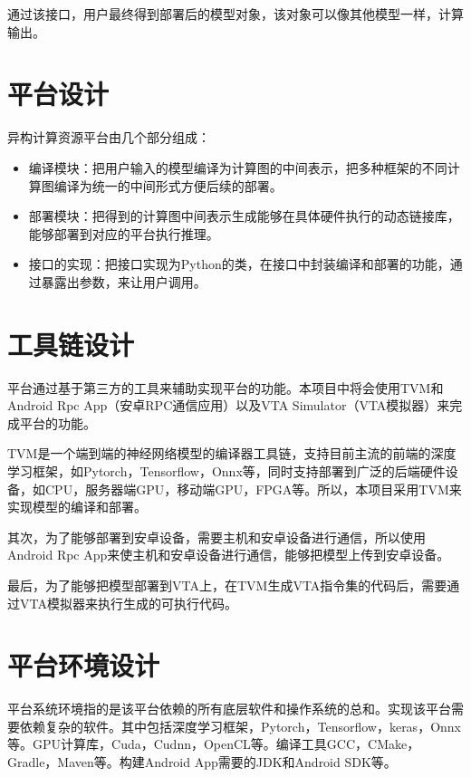 通过该接口，用户最终得到部署后的模型对象，该对象可以像其他模型一样，计算输出。



\section{平台设计}

异构计算资源平台由几个部分组成：
\begin{itemize}
    \item {编译模块：把用户输入的模型编译为计算图的中间表示，把多种框架的不同计算图编译为统一的中间形式方便后续的部署。}
    \item {部署模块：把得到的计算图中间表示生成能够在具体硬件执行的动态链接库，能够部署到对应的平台执行推理。}
    \item {接口的实现：把接口实现为Python的类，在接口中封装编译和部署的功能，通过暴露出参数，来让用户调用。}
\end{itemize}


\section{工具链设计}

平台通过基于第三方的工具来辅助实现平台的功能。本项目中将会使用TVM和Android Rpc App（安卓RPC通信应用）以及VTA Simulator（VTA模拟器）来完成平台的功能。

TVM是一个端到端的神经网络模型的编译器工具链，支持目前主流的前端的深度学习框架，如Pytorch，Tensorflow，Onnx等，同时支持部署到广泛的后端硬件设备，如CPU，服务器端GPU，移动端GPU，FPGA等。所以，本项目采用TVM来实现模型的编译和部署。

其次，为了能够部署到安卓设备，需要主机和安卓设备进行通信，所以使用Android Rpc App来使主机和安卓设备进行通信，能够把模型上传到安卓设备。

最后，为了能够把模型部署到VTA上，在TVM生成VTA指令集的代码后，需要通过VTA模拟器来执行生成的可执行代码。


\section{平台环境设计}

平台系统环境指的是该平台依赖的所有底层软件和操作系统的总和。实现该平台需要依赖复杂的软件。其中包括深度学习框架，Pytorch，Tensorflow，keras，Onnx等。GPU计算库，Cuda，Cudnn，OpenCL等。编译工具GCC，CMake，Gradle，Maven等。构建Android App需要的JDK和Android SDK等。
